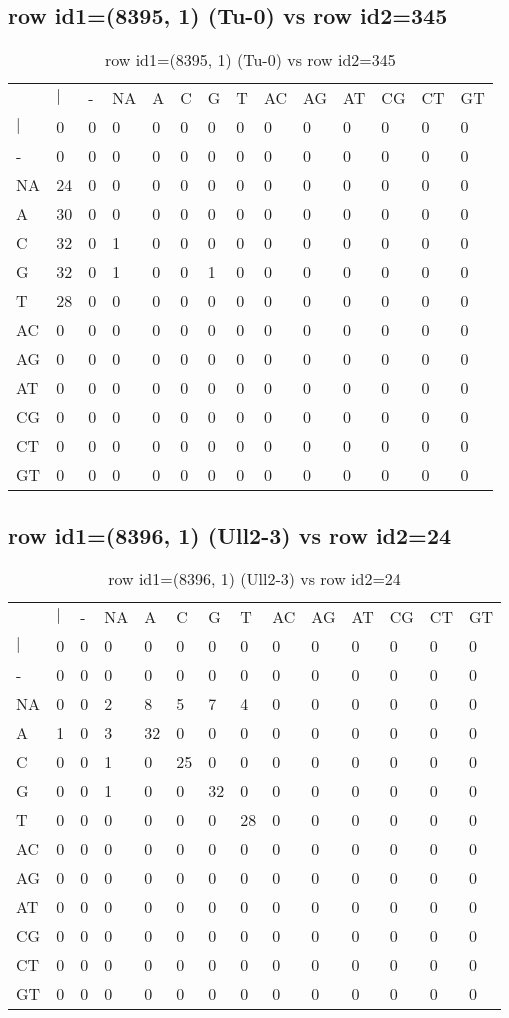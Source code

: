\subsection{row id1=(8395, 1) (Tu-0) vs row id2=345}
\begin{center}
\begin{longtable}{|l|l|l|l|l|l|l|l|l|l|l|l|l|l|}
\caption{row id1=(8395, 1) (Tu-0) vs row id2=345} \label{table_dm458}\\
\hline
\\
\hline
&$|$&-&NA&A&C&G&T&AC&AG&AT&CG&CT&GT\\
$|$&0&0&0&0&0&0&0&0&0&0&0&0&0\\
-&0&0&0&0&0&0&0&0&0&0&0&0&0\\
NA&24&0&0&0&0&0&0&0&0&0&0&0&0\\
A&30&0&0&0&0&0&0&0&0&0&0&0&0\\
C&32&0&1&0&0&0&0&0&0&0&0&0&0\\
G&32&0&1&0&0&1&0&0&0&0&0&0&0\\
T&28&0&0&0&0&0&0&0&0&0&0&0&0\\
AC&0&0&0&0&0&0&0&0&0&0&0&0&0\\
AG&0&0&0&0&0&0&0&0&0&0&0&0&0\\
AT&0&0&0&0&0&0&0&0&0&0&0&0&0\\
CG&0&0&0&0&0&0&0&0&0&0&0&0&0\\
CT&0&0&0&0&0&0&0&0&0&0&0&0&0\\
GT&0&0&0&0&0&0&0&0&0&0&0&0&0\\
\hline
\end{longtable}
\end{center}

\subsection{row id1=(8396, 1) (Ull2-3) vs row id2=24}
\begin{center}
\begin{longtable}{|l|l|l|l|l|l|l|l|l|l|l|l|l|l|}
\caption{row id1=(8396, 1) (Ull2-3) vs row id2=24} \label{table_dm460}\\
\hline
\\
\hline
&$|$&-&NA&A&C&G&T&AC&AG&AT&CG&CT&GT\\
$|$&0&0&0&0&0&0&0&0&0&0&0&0&0\\
-&0&0&0&0&0&0&0&0&0&0&0&0&0\\
NA&0&0&2&8&5&7&4&0&0&0&0&0&0\\
A&1&0&3&32&0&0&0&0&0&0&0&0&0\\
C&0&0&1&0&25&0&0&0&0&0&0&0&0\\
G&0&0&1&0&0&32&0&0&0&0&0&0&0\\
T&0&0&0&0&0&0&28&0&0&0&0&0&0\\
AC&0&0&0&0&0&0&0&0&0&0&0&0&0\\
AG&0&0&0&0&0&0&0&0&0&0&0&0&0\\
AT&0&0&0&0&0&0&0&0&0&0&0&0&0\\
CG&0&0&0&0&0&0&0&0&0&0&0&0&0\\
CT&0&0&0&0&0&0&0&0&0&0&0&0&0\\
GT&0&0&0&0&0&0&0&0&0&0&0&0&0\\
\hline
\end{longtable}
\end{center}

